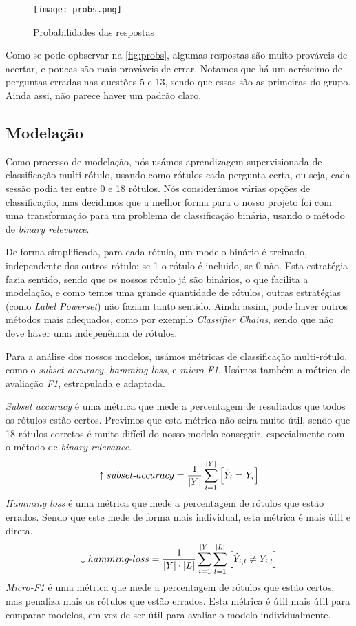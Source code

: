 \documentclass[justified, 11pt]{scrartcl}
\begin{document}
  \begin{figure}[H]
    \centering
    \texttt{[image: probs.png]}
    \caption{Probabilidades das respostas}
    \label{fig:probs}
  \end{figure}

  Como se pode opbservar na \autoref{fig:probs}, algumas respostas são muito prováveis de acertar, e poucas são mais prováveis de errar. Notamos que há um acréscimo de perguntas erradas nas questões 5 e 13, sendo que essas são as primeiras do grupo. Ainda assi, não parece haver um padrão claro.
  \subsection{Modelação}
  Como processo de modelação, nós usámos aprendizagem supervisionada de classificação multi-rótulo, usando como rótulos cada pergunta certa, ou seja, cada sessão podia ter entre 0 e 18 rótulos. Nós considerámos várias opções de classificação, mas decidimos que a melhor forma para o nosso projeto foi com uma transformação para um problema de classificação binária, usando o método de \textit{binary relevance}.
  
  De forma simplificada, para cada rótulo, um modelo binário é treinado, independente dos outros rótulo; se 1 o rótulo é incluido, se 0 não. Esta estratégia fazia sentido, sendo que os nossos rótulo já são binários, o que facilita a modelação, e como temos uma grande quantidade de rótulos, outras estratégias (como \textit{Label Powerset}) não faziam tanto sentido. Ainda assim, pode haver outros métodos mais adequados, como por exemplo \textit{Classifier Chains}, sendo que não deve haver uma indepenência de rótulos.

  Para a análise dos nossos modelos, usámos métricas de classificação multi-rótulo, como o \textit{subset accuracy}, \textit{hamming loss}, e \textit{micro-F1}. Usámos também a métrica de avaliação \textit{F1}, estrapulada e adaptada.

  \textit{Subset accuracy} é uma métrica que mede a percentagem de resultados que todos os rótulos estão certos. Previmos que esta métrica não seira muito útil, sendo que 18 rótulos corretos é muito difícil do nosso modelo conseguir, especialmente com o método de \textit{binary relevance}.
  $$
  \uparrow \mathnormal{subset\text{-}accuracy} = \frac{1}{|Y|} \sum_{i=1}^{|Y|}  \left[ 
    \hat{Y}_i = Y_i
    \right] 
  $$
  \textit{Hamming loss} é uma métrica que mede a percentagem de rótulos que estão errados. Sendo que este mede de forma mais individual, esta métrica é mais útil e direta.
  $$
  \downarrow \mathnormal{hamming\text{-}loss} = \frac{1}{|Y|\cdot|L|} \sum_{i=1}^{|Y|} \sum_{l=1}^{|L|} \left[ 
    \hat{Y}_{i,l} \neq Y_{i,l}
    \right]
  $$
  \textit{Micro-F1} é uma métrica que mede a percentagem de rótulos que estão certos, mas penaliza mais os rótulos que estão errados. Esta métrica é útil mais útil para comparar modelos, em vez de ser útil para avaliar o modelo individualmente.
\end{document}
